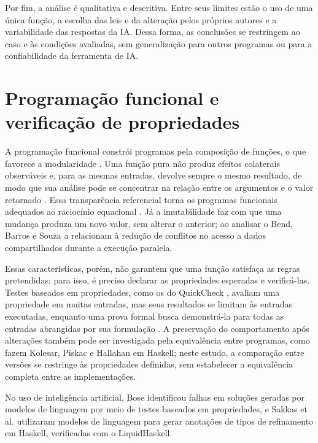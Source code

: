 Por fim, a análise é qualitativa e descritiva. Entre seus limites estão o uso de uma única função, a escolha das leis e da alteração pelos próprios autores e a variabilidade das respostas da IA. Dessa forma, as conclusões se restringem ao caso e às condições avaliadas, sem generalização para outros programas ou para a confiabilidade da ferramenta de IA.

\section{Programação funcional e verificação de propriedades}

A programação funcional constrói programas pela composição de funções, o que favorece a modularidade \cite{Hughes1989}. Uma função pura não produz efeitos colaterais observáveis e, para as mesmas entradas, devolve sempre o mesmo resultado, de modo que sua análise pode se concentrar na relação entre os argumentos e o valor retornado \cite{Sabry1998,HuHughesWang2015}. Essa transparência referencial torna os programas funcionais adequados ao raciocínio equacional \cite{AffeldtEtAl2025}. Já a imutabilidade faz com que uma mudança produza um novo valor, sem alterar o anterior; ao analisar o Bend, Barros e Souza \cite{BarrosSouza2025} a relacionam à redução de conflitos no acesso a dados compartilhados durante a execução paralela.

Essas características, porém, não garantem que uma função satisfaça as regras pretendidas: para isso, é preciso declarar as propriedades esperadas e verificá-las. Testes baseados em propriedades, como os do QuickCheck \cite{ClaessenHughes2000}, avaliam uma propriedade em muitas entradas, mas seus resultados se limitam às entradas executadas, enquanto uma prova formal busca demonstrá-la para todas as entradas abrangidas por sua formulação \cite{AffeldtEtAl2025}. A preservação do comportamento após alterações também pode ser investigada pela equivalência entre programas, como fazem Kolesar, Piskac e Hallahan \cite{KolesarEtAl2025} em Haskell; neste estudo, a comparação entre versões se restringe às propriedades definidas, sem estabelecer a equivalência completa entre as implementações.

No uso de inteligência artificial, Bose \cite{Bose2025} identificou falhas em soluções geradas por modelos de linguagem por meio de testes baseados em propriedades, e Sakkas et al. \cite{SakkasEtAl2025} utilizaram modelos de linguagem para gerar anotações de tipos de refinamento em Haskell, verificadas com o LiquidHaskell.

